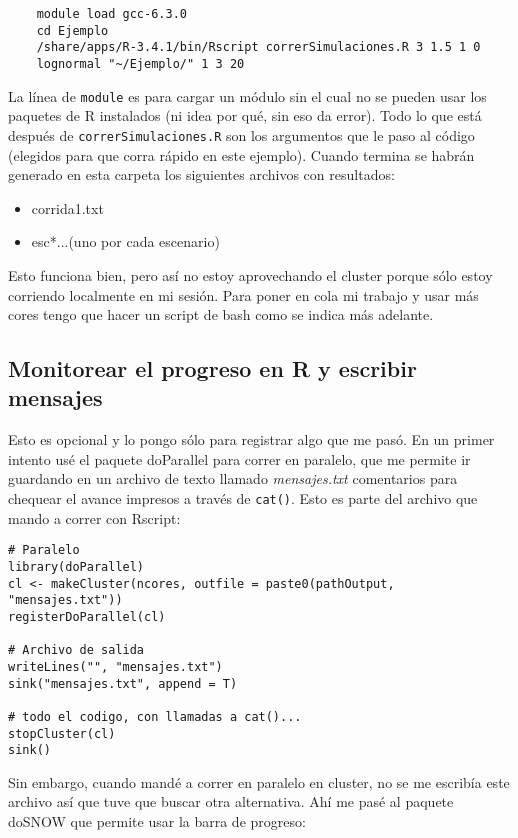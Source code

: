 \documentclass[paper=a4, fontsize=11pt]{article} %
\numberwithin{equation}{section} %
\numberwithin{figure}{section} %
\numberwithin{table}{section} %
\begin{document}
\begin{verbatim}
	module load gcc-6.3.0
	cd Ejemplo
	/share/apps/R-3.4.1/bin/Rscript correrSimulaciones.R 3 1.5 1 0 
	lognormal "~/Ejemplo/" 1 3 20	
\end{verbatim}

La línea de \texttt{module} es para cargar un módulo sin el cual no se pueden usar los paquetes de R instalados (ni idea por qué, sin eso da error). Todo lo que está después de \texttt{correrSimulaciones.R} son los argumentos que le paso al código (elegidos para que corra rápido en este ejemplo). Cuando termina se habrán generado en esta carpeta los siguientes archivos con resultados:

\begin{itemize}
	\item corrida1.txt
	\item esc*...(uno por cada escenario)
\end{itemize}

Esto funciona bien, pero así no estoy aprovechando el cluster porque sólo estoy corriendo localmente en mi sesión. Para poner en cola mi trabajo y usar más cores tengo que hacer un script de bash como se indica más adelante.

\subsection{Monitorear el progreso en R y escribir mensajes}

Esto es opcional y lo pongo sólo para registrar algo que me pasó. En un primer intento usé el paquete doParallel para correr en paralelo, que me permite ir guardando en un archivo de texto llamado \textit{mensajes.txt} comentarios para chequear el avance impresos a través de \texttt{cat()}. Esto es parte del archivo que mando a correr con Rscript:

\begin{verbatim}
# Paralelo
library(doParallel)
cl <- makeCluster(ncores, outfile = paste0(pathOutput, "mensajes.txt"))
registerDoParallel(cl)

# Archivo de salida
writeLines("", "mensajes.txt")
sink("mensajes.txt", append = T)

# todo el codigo, con llamadas a cat()...				stopCluster(cl)
sink()
\end{verbatim}

Sin embargo, cuando mandé a correr en paralelo en cluster, no se me escribía este archivo así que tuve que buscar otra alternativa. Ahí me pasé al paquete doSNOW que permite usar la barra de progreso:
\end{document}

